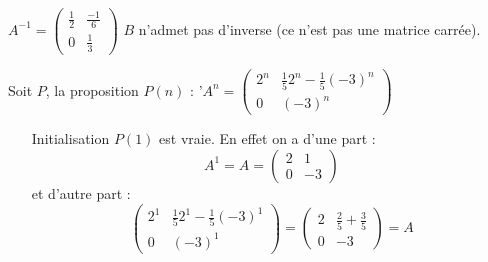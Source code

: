 \documentclass[a4paper, 11pt,reqno]{article}
\begin{document}
\begin{correction}
$A^{-1} = \left(\begin{array}{rr} \frac{1}{2}&\frac{-1}{6}\\0&\frac{1}{3}\end{array}\right)$
$B$ n'admet pas d'inverse (ce n'est pas une matrice carrée).

Soit $P$, la proposition  $P(n)$ :  '$A^n = \left(\begin{array}{rc} 2^n&\frac{1}{5}2^n - \frac{1}{5}(-3)^n\\0&(-3)^n \end{array}\right) $

\begin{itemize}
\item[Initialisation] $P(1)$  est vraie. En effet  on a d'une part  :
$$A^1= A= \left(\begin{array}{rr} 2&1\\0&-3 \end{array}\right)$$
et d'autre part :  
$$ \left(\begin{array}{rc} 2^1&\frac{1}{5}2^1 - \frac{1}{5}(-3)^1\\0&(-3)^1 \end{array}\right) = \left(\begin{array}{rc} 2&\frac{2}{5}+\frac{3}{5}\\0&-3 \end{array}\right) = A$$


\end{itemize}
\end{correction}
\end{document}
